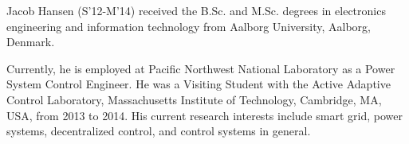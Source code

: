 \documentclass[journal]{IEEEtran}
\begin{document}
  \begin{IEEEbiography}
 {Jacob Hansen}
 (S'12-M'14) received
the B.Sc. and M.Sc. degrees in electronics
engineering and information technology from
Aalborg University, Aalborg, Denmark.

Currently, he is employed at Pacific Northwest National Laboratory as a Power System Control Engineer. He was a Visiting Student with the Active Adaptive Control Laboratory, Massachusetts Institute of Technology, Cambridge, MA, USA,
from 2013 to 2014. His current research interests include smart grid, power systems, decentralized
control, and control systems in general.
\end{IEEEbiography}









\end{document}
